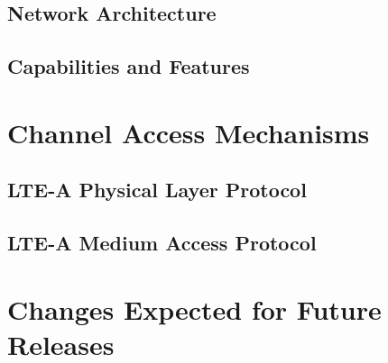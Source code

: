 \subsection{Network Architecture}
\label{net-arch}

\subsection{Capabilities and Features}
\label{cap-feat}

\section{Channel Access Mechanisms}
\label{channel-access}

\subsection{LTE-A Physical Layer Protocol}
\label{lte-phy}

\subsection{LTE-A Medium Access Protocol}
\label{lte-mac}

\section {Changes Expected for Future Releases}
\label{fut-chnge}


%